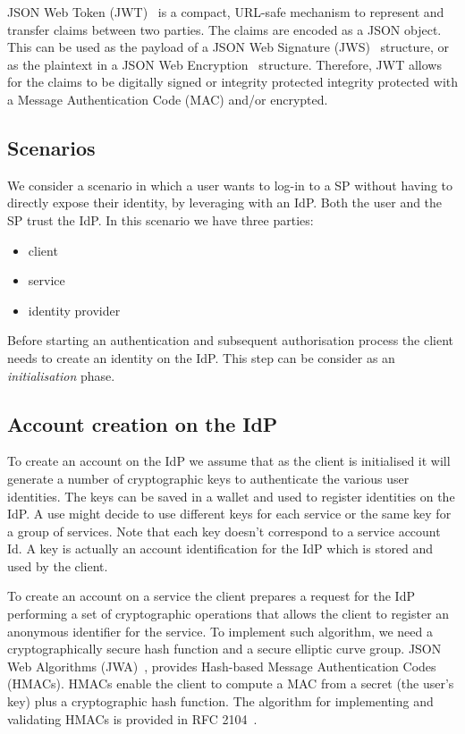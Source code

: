 JSON Web Token (JWT)~\cite{jones2015json} is a compact, URL-safe mechanism to represent and transfer claims between two parties. The claims are encoded as a JSON object. This can be used as the payload of a JSON Web Signature (JWS)~\cite{jones2014n} structure, or as the plaintext in a JSON Web Encryption~\cite{jones2015jwe} structure. Therefore, JWT allows for the claims to be digitally signed or integrity protected integrity protected with a Message Authentication Code (MAC) and/or encrypted.

\subsection{Scenarios}

We consider a scenario in which a user wants to log-in to a SP without having to directly expose their identity, by leveraging with an IdP. Both the user and the SP trust the IdP. In this scenario we have three parties:
\begin{itemize}
    \item client
    \item service
    \item identity provider
\end{itemize}

Before starting an authentication and subsequent authorisation process the client needs to create an identity on the IdP. This step can be consider as an \emph{initialisation} phase.

\subsection{Account creation on the IdP}

To create an account on the IdP we assume that as the client is initialised it will generate a number of cryptographic keys to authenticate the various user identities. The keys can be saved in a wallet and used to register identities on the IdP. A use might decide to use different keys for each service or the same key for a group of services. Note that each key doesn't correspond to a service account Id. A key is actually an account identification for the IdP which is stored and used by the client.

To create an account on a service the client prepares a request for the IdP performing a set of cryptographic operations that allows the client to register an anonymous identifier for the service. To implement such algorithm, we need a
cryptographically secure hash function and a secure elliptic curve group. JSON Web Algorithms (JWA)~\cite{jones2015jwa}, provides Hash-based Message Authentication Codes (HMACs). HMACs enable the client to compute a MAC from a secret (the user's key) plus a cryptographic hash function. The algorithm for implementing and validating HMACs is provided in RFC 2104~\cite{krawczyk1997rfc}.

